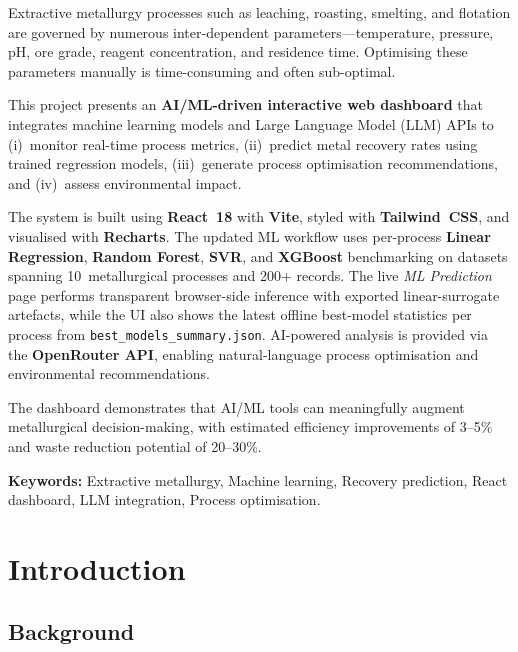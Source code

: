 \documentclass[12pt,a4paper]{report}
\newcommand{\code}[1]{\texttt{#1}}
\begin{document}
Extractive metallurgy processes such as leaching, roasting, smelting, and flotation are governed by numerous inter-dependent parameters—temperature, pressure, pH, ore grade, reagent concentration, and residence time. Optimising these parameters manually is time-consuming and often sub-optimal.

This project presents an \textbf{AI/ML-driven interactive web dashboard} that integrates machine learning models and Large Language Model (LLM) APIs to (i)~monitor real-time process metrics, (ii)~predict metal recovery rates using trained regression models, (iii)~generate process optimisation recommendations, and (iv)~assess environmental impact.

The system is built using \textbf{React~18} with \textbf{Vite}, styled with \textbf{Tailwind~CSS}, and visualised with \textbf{Recharts}. The updated ML workflow uses per-process \textbf{Linear Regression}, \textbf{Random Forest}, \textbf{SVR}, and \textbf{XGBoost} benchmarking on datasets spanning 10~metallurgical processes and 200+ records. The live \emph{ML Prediction} page performs transparent browser-side inference with exported linear-surrogate artefacts, while the UI also shows the latest offline best-model statistics per process from \code{best\_models\_summary.json}. AI-powered analysis is provided via the \textbf{OpenRouter API}, enabling natural-language process optimisation and environmental recommendations.

The dashboard demonstrates that AI/ML tools can meaningfully augment metallurgical decision-making, with estimated efficiency improvements of 3–5\% and waste reduction potential of 20–30\%.

\textbf{Keywords:} Extractive metallurgy, Machine learning, Recovery prediction, React dashboard, LLM integration, Process optimisation.

\tableofcontents
\listoffigures
\listoftables

\chapter{Introduction}
\label{ch:introduction}

\section{Background}
\end{document}
